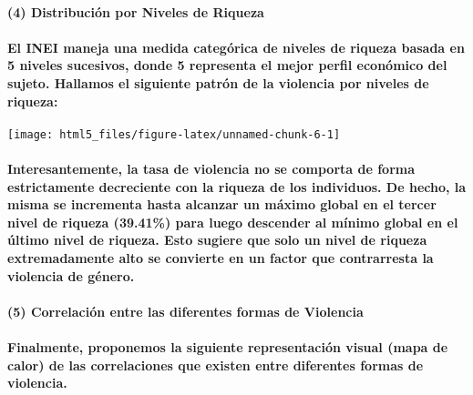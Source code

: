 \documentclass[]{article}
\let\oldparagraph\paragraph
\renewcommand{\paragraph}[1]{\oldparagraph{#1}\mbox{}}
\begin{document}
\paragraph{(4) Distribución por Niveles de
Riqueza}\label{distribucion-por-niveles-de-riqueza}

\paragraph{El INEI maneja una medida categórica de niveles de riqueza
basada en 5 niveles sucesivos, donde 5 representa el mejor perfil
económico del sujeto. Hallamos el siguiente patrón de la violencia por
niveles de
riqueza:}\label{el-inei-maneja-una-medida-categorica-de-niveles-de-riqueza-basada-en-5-niveles-sucesivos-donde-5-representa-el-mejor-perfil-economico-del-sujeto.-hallamos-el-siguiente-patron-de-la-violencia-por-niveles-de-riqueza}

\begin{center}\texttt{[image: html5\_files/figure-latex/unnamed-chunk-6-1]} \end{center}

\paragraph{Interesantemente, la tasa de violencia no se comporta de
forma estrictamente decreciente con la riqueza de los individuos. De
hecho, la misma se incrementa hasta alcanzar un máximo global en el
tercer nivel de riqueza (39.41\%) para luego descender al mínimo global
en el último nivel de riqueza. Esto sugiere que solo un nivel de riqueza
extremadamente alto se convierte en un factor que contrarresta la
violencia de
género.}\label{interesantemente-la-tasa-de-violencia-no-se-comporta-de-forma-estrictamente-decreciente-con-la-riqueza-de-los-individuos.-de-hecho-la-misma-se-incrementa-hasta-alcanzar-un-maximo-global-en-el-tercer-nivel-de-riqueza-39.41-para-luego-descender-al-minimo-global-en-el-ultimo-nivel-de-riqueza.-esto-sugiere-que-solo-un-nivel-de-riqueza-extremadamente-alto-se-convierte-en-un-factor-que-contrarresta-la-violencia-de-genero.}

\paragraph{(5) Correlación entre las diferentes formas de
Violencia}\label{correlacion-entre-las-diferentes-formas-de-violencia}

\paragraph{Finalmente, proponemos la siguiente representación visual
(mapa de calor) de las correlaciones que existen entre diferentes formas
de
violencia.}\label{finalmente-proponemos-la-siguiente-representacion-visual-mapa-de-calor-de-las-correlaciones-que-existen-entre-diferentes-formas-de-violencia.}
\end{document}

